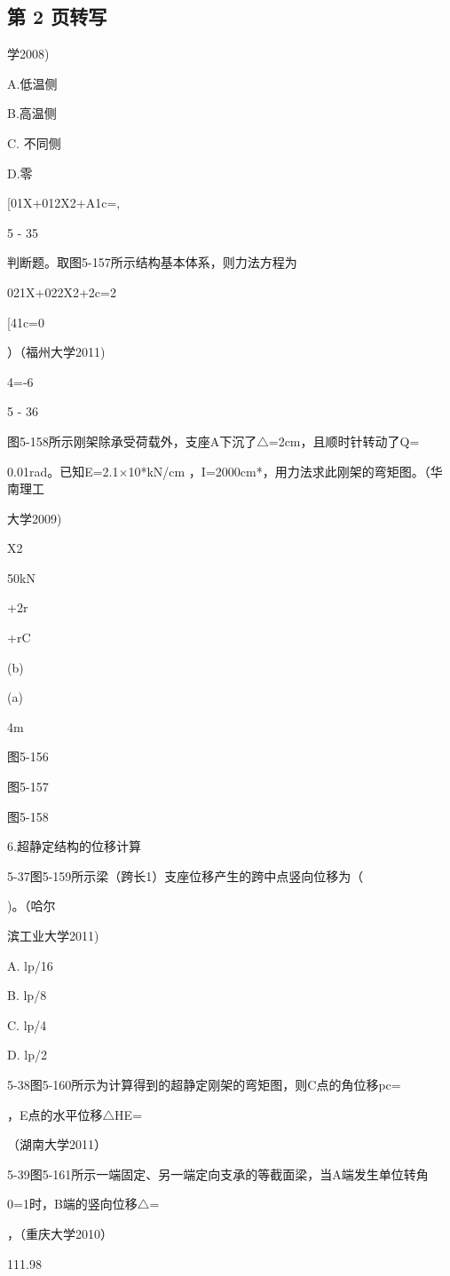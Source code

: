 \subsection*{第 2 页转写}
学2008)

A.低温侧

B.高温侧

C. 不同侧

D.零

[01X+012X2+A1c=,

5 - 35

判断题。取图5-157所示结构基本体系，则力法方程为

021X+022X2+2c=2

[41c=0

）（福州大学2011)

4=-6

5 - 36

图5-158所示刚架除承受荷载外，支座A下沉了$\triangle$=2cm，且顺时针转动了Q=

0.01rad。已知E=2.1$\times$10*kN/cm ，I=2000cm*，用力法求此刚架的弯矩图。（华南理工

大学2009)

X2

50kN

+2r 

+rC

(b)

(a)

4m

图5-156

图5-157

图5-158

6.超静定结构的位移计算

5-37图5-159所示梁（跨长1）支座位移产生的跨中点竖向位移为（

)。（哈尔

滨工业大学2011)

A. lp/16

B. lp/8

C. lp/4

D. lp/2

5-38图5-160所示为计算得到的超静定刚架的弯矩图，则C点的角位移pc=

，E点的水平位移$\triangle$HE=

（湖南大学2011）

5-39图5-161所示一端固定、另一端定向支承的等截面梁，当A端发生单位转角

0=1时，B端的竖向位移$\triangle$=

，（重庆大学2010）

111.98

